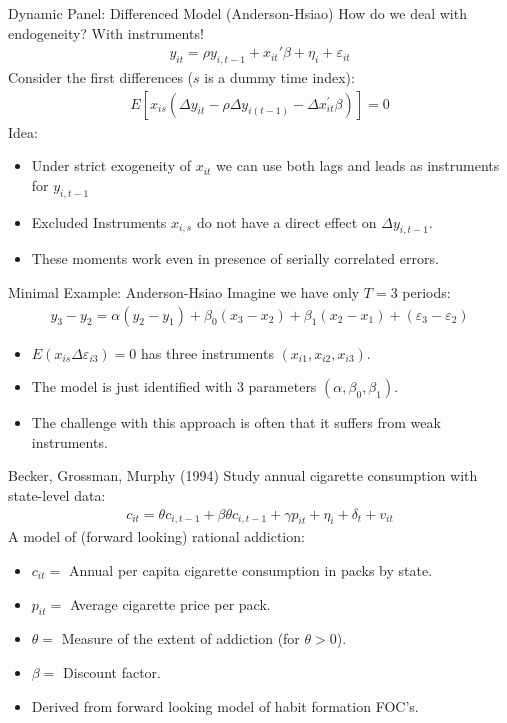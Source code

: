 \documentclass[aspectratio=169]{beamer}
\begin{document}
\begin{frame}{Dynamic Panel: Differenced Model (Anderson-Hsiao)}
How do we deal with endogeneity? With \alert{instruments}!
\begin{eqnarray*}
y_{it} = \rho y_{i,t-1} + x_{it}'\beta + \eta_i + \varepsilon_{it}
\end{eqnarray*}
Consider the first differences ($s$ is a dummy time index):
\begin{eqnarray*}
E\left[x_{i s}\left(\Delta y_{i t}-\rho \Delta y_{i(t-1)}-\Delta x_{i t}^{\prime} \beta\right)\right]=0
\end{eqnarray*}
Idea:
\begin{itemize}
\item Under \alert{strict exogeneity} of $x_{it}$ we can use both \alert{lags} and \alert{leads} as instruments for $y_{i,t-1}$
\item \alert{Excluded Instruments} $x_{i,s}$ do not have a direct effect on $\Delta y_{i,t-1}$.
\item These moments work even in presence of \alert{serially correlated errors}.
\end{itemize}
\end{frame}


\begin{frame}{Minimal Example: Anderson-Hsiao}
Imagine we have only $T=3$ periods:
\begin{align*}
y_{3}-y_{2}=\alpha\left(y_{2}-y_{1}\right)+\beta_{0}\left(x_{3}-x_{2}\right)+\beta_{1}\left(x_{2}-x_{1}\right)+\left(\varepsilon_{3}-\varepsilon_{2}\right)
\end{align*}
\begin{itemize}
\item $E\left(x_{i s} \Delta \varepsilon_{i 3}\right)=0$ has three instruments $(x_{i1},x_{i2},x_{i3})$.
\item The model is \alert{just identified} with 3 parameters $(\alpha,\beta_0,\beta_1)$.
\item The challenge with this approach is often that it suffers from \alert{weak instruments}.
\end{itemize}
\end{frame}

\begin{frame}{Becker, Grossman, Murphy (1994)}
Study annual cigarette consumption with state-level data:
\begin{align*}
c_{it} = \theta c_{i,t-1} +\beta \theta c_{i,t-1} + \gamma p_{it} + \eta_{i} + \delta_t + v_{it}
\end{align*}
A model of (forward looking) \alert{rational addiction}:
\begin{itemize}
\item $c_{it} = $ Annual per capita cigarette consumption in packs by state.
\item $p_{it} =$ Average cigarette price per pack.
\item $\theta = $ Measure of the extent of addiction (for $\theta > 0$).
\item $\beta= $ Discount factor.
\item Derived from forward looking model of \alert{habit formation} FOC's.
\end{itemize}
\end{frame}
\end{document}
